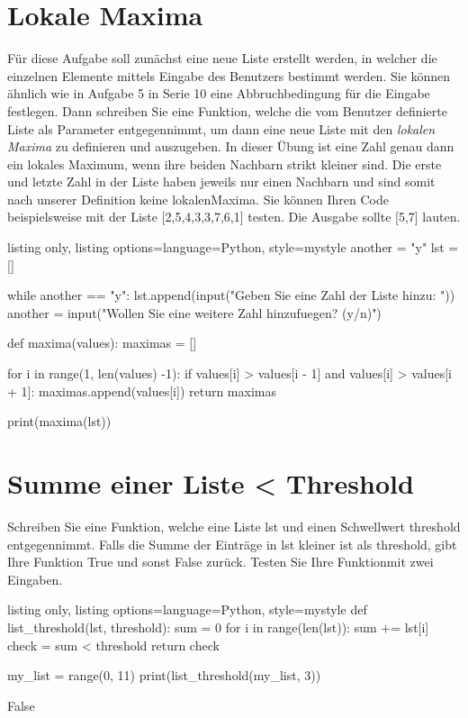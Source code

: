 \documentclass[11pt, oneside]{book}
\begin{document}
\section{Lokale Maxima}
Für diese Aufgabe soll zunächst eine neue Liste erstellt werden, in welcher die einzelnen Elemente mittels Eingabe des Benutzers bestimmt werden. Sie können ähnlich wie in Aufgabe 5 in Serie 10 eine Abbruchbedingung für die Eingabe festlegen. Dann schreiben Sie eine Funktion, welche die vom Benutzer definierte Liste als Parameter entgegennimmt, um dann eine neue Liste mit den \textit{lokalen Maxima} zu definieren und auszugeben. In dieser Übung ist eine Zahl genau dann ein lokales Maximum, wenn ihre beiden Nachbarn strikt kleiner sind. Die erste und letzte Zahl in der Liste haben jeweils nur einen Nachbarn und sind somit nach unserer Definition keine lokalenMaxima. Sie können Ihren Code beispielsweise mit der Liste [2,5,4,3,3,7,6,1] testen. Die Ausgabe sollte [5,7] lauten.
\begin{tcblisting}{listing only, listing options={language=Python, style=mystyle}}
another = "y"
lst = []

while another == "y":
    lst.append(input("Geben Sie eine Zahl der Liste hinzu: "))
    another = input("Wollen Sie eine weitere Zahl hinzufuegen? (y/n)")

def maxima(values):
    maximas = []

    for i in range(1, len(values) -1): 
        if values[i] > values[i - 1] and values[i] > values[i + 1]:
            maximas.append(values[i])
    return maximas

print(maxima(lst))
\end{tcblisting}

\newpage

\section{Summe einer Liste < Threshold}
Schreiben Sie eine Funktion, welche eine Liste lst und einen Schwellwert threshold entgegennimmt.
Falls die Summe der Einträge in lst kleiner ist als threshold, gibt Ihre Funktion
True und sonst False zurück. Testen Sie Ihre Funktionmit zwei Eingaben.
\begin{tcblisting}{listing only, listing options={language=Python, style=mystyle}}
def list_threshold(lst, threshold):
    sum = 0
    for i in range(len(lst)):
        sum += lst[i]
    check = sum < threshold
    return check

my_list = range(0, 11)
print(list_threshold(my_list, 3))

False

\end{tcblisting}
\end{document}
